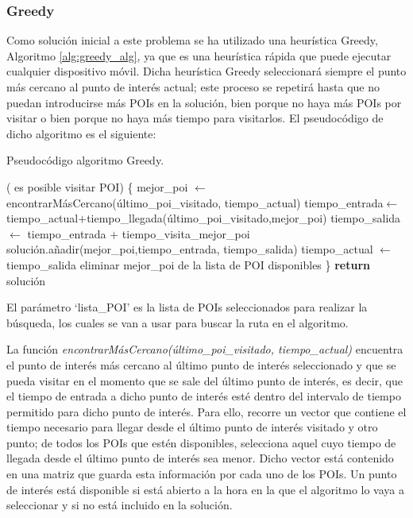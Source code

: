 \subsubsection{Greedy}
Como solución inicial a este problema se ha utilizado una heurística Greedy, Algoritmo \ref{alg:greedy_alg}, ya que es una heurística rápida que puede ejecutar cualquier dispositivo móvil. Dicha heurística Greedy seleccionará siempre el punto más cercano al punto de interés actual; este proceso se repetirá hasta que no puedan introducirse más POIs en la solución, bien porque no haya más POIs por visitar o bien porque no haya más tiempo para visitarlos. El pseudocódigo de dicho algoritmo es el siguiente:\newline
\begin{algorithm}[H]
	\caption{Pseudocódigo algoritmo Greedy.}
	\label{alg:greedy_alg}
	\begin{algorithmic}
		\While( es posible visitar POI) \{
		\State mejor\_poi $\gets$ encontrarMásCercano(último\_poi\_visitado, tiempo\_actual) 
		\State tiempo\_entrada$\gets$tiempo\_actual$+$tiempo\_llegada(último\_poi\_visitado,mejor\_poi)
		\State tiempo\_salida $\gets$ tiempo\_entrada $+$ tiempo\_visita\_mejor\_poi
		\State solución.añadir(mejor\_poi,tiempo\_entrada, tiempo\_salida)
		\State tiempo\_actual $\gets$ tiempo\_salida
		\State eliminar mejor\_poi de la lista de POI disponibles
		\State \}
		\EndWhile
		\State \textbf{return} solución
		\EndFunction
	\end{algorithmic}
\end{algorithm}
\vspace{0.06in}
El parámetro \enquote*{lista\_POI} es la lista de POIs seleccionados para realizar la búsqueda, los cuales se van a usar para buscar la ruta en el algoritmo.\newline

La función \textit{encontrarMásCercano(último\_poi\_visitado, tiempo\_actual)} encuentra el punto de interés más cercano al último punto de interés seleccionado y que se pueda visitar en el momento que se sale del último punto de interés, es decir, que el tiempo de entrada a dicho punto de interés esté dentro del intervalo de tiempo permitido para dicho punto de interés. Para ello, recorre un vector que contiene el tiempo necesario para llegar desde el último punto de interés visitado y otro punto; de todos los POIs que estén disponibles, selecciona aquel cuyo tiempo de llegada desde el último punto de interés sea menor. Dicho vector está contenido en una matriz que guarda esta información por cada uno de los POIs. Un punto de interés está disponible si está abierto a la hora en la que el algoritmo lo vaya a seleccionar y si no está incluido en la solución.\newline

